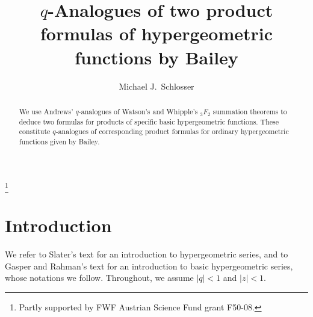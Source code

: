 

\newtheorem{theorem}{Theorem}
\newtheorem{proposition}{Proposition}
\newtheorem{corollary}{Corollary}
\newtheorem{conjecture}{Conjecture}
\newtheorem{lemma}{Lemma}

\theoremstyle{remark}
\newtheorem{remark}{Remark}
\newtheorem{definition}{Definition}

\setlength{\textwidth}{160.0mm}
\setlength{\oddsidemargin}{0mm}
\setlength{\evensidemargin}{0mm}
\addtolength{\topmargin}{-.5cm}

\addtolength{\textheight}{1cm}


\allowdisplaybreaks

\author{Michael J.\ Schlosser}
\address{Fakult\"at f\"ur Mathematik, Universit\"at Wien,
Oskar-Morgenstern-Platz~1, A-1090 Vienna, Austria}
\thanks{Partly supported by FWF Austrian Science Fund
grant F50-08.}

\title[$q$-Analogues of two product formulas of hypergeometric functions]
{$q$-Analogues of two product formulas of hypergeometric functions by Bailey}





\begin{abstract}
We use Andrews' $q$-analogues of Watson's and Whipple's $_3F_2$
summation theorems to deduce two formulas for products of specific
basic hypergeometric functions. These constitute $q$-analogues of
corresponding product formulas for ordinary hypergeometric functions
given by Bailey.
\end{abstract}


\maketitle

\section{Introduction}\label{secintro}
We refer to Slater's text \cite{Sl} for an introduction to
hypergeometric series, and to Gasper and Rahman's text \cite{GR}
for an introduction to basic hypergeometric series, whose notations we follow.
Throughout, we assume $|q|<1$ and $|z|<1$.

